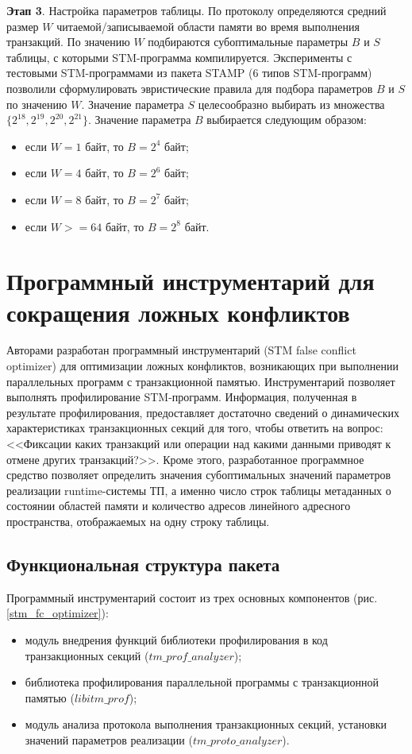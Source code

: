 \textbf{Этап 3}. Настройка параметров таблицы. По протоколу определяются средний 
размер $W$ читаемой/записываемой области памяти во время выполнения транзакций. 
По значению $W$ подбираются субоптимальные параметры $B$ и $S$ таблицы, с 
которыми STM-программа компилируется. Эксперименты с тестовыми STM-программами 
из пакета STAMP (6 типов STM-программ) позволили сформулировать эвристические 
правила для подбора параметров $B$ и $S$ по значению $W$. Значение параметра $S$ 
целесообразно выбирать из множества $\{2^{18}, 2^{19}, 2^{20}, 2^{21}\}$. 
Значение параметра $B$ выбирается следующим образом:
\begin{itemize}
\item если $\textit{W} = 1$ байт, то $\textit{B} = 2^{4}$ байт;
\item если $\textit{W} = 4$ байт, то $\textit{B} = 2^{6}$ байт;
\item если $\textit{W} = 8$ байт, то $\textit{B} = 2^{7}$ байт;
\item если $\textit{W} >= 64$ байт, то $\textit{B} = 2^{8}$ байт.
\end{itemize}

\section{Программный инструментарий для сокращения ложных конфликтов}
Авторами разработан программный инструментарий (STM false conflict optimizer) 
для оптимизации ложных конфликтов, возникающих при выполнении параллельных 
программ с транзакционной памятью. Инструментарий позволяет выполнять 
профилирование STM-программ. Информация, полученная в результате профилирования, 
предоставляет достаточно сведений о динамических характеристиках транзакционных 
секций для того, чтобы ответить на вопрос: <<Фиксации каких транзакций или 
операции над какими данными приводят к отмене других транзакций?>>. Кроме этого, 
разработанное программное средство позволяет определить значения субоптимальных 
значений параметров реализации runtime-системы ТП, а именно число строк таблицы 
метаданных о состоянии областей памяти и количество адресов линейного адресного 
пространства, отображаемых на одну строку таблицы.

\subsection{Функциональная структура пакета}
Программный инструментарий состоит из трех основных компонентов (рис. 
\ref{stm_fc_optimizer}):
\begin{itemize}
\item модуль внедрения функций библиотеки профилирования в код транзакционных 
секций ($tm\_prof\_analyzer$);
\item библиотека профилирования параллельной программы с транзакционной памятью 
($libitm\_prof$);
\item модуль анализа протокола выполнения транзакционных секций, установки 
значений параметров реализации ($tm\_proto\_analyzer$).
\end{itemize}

